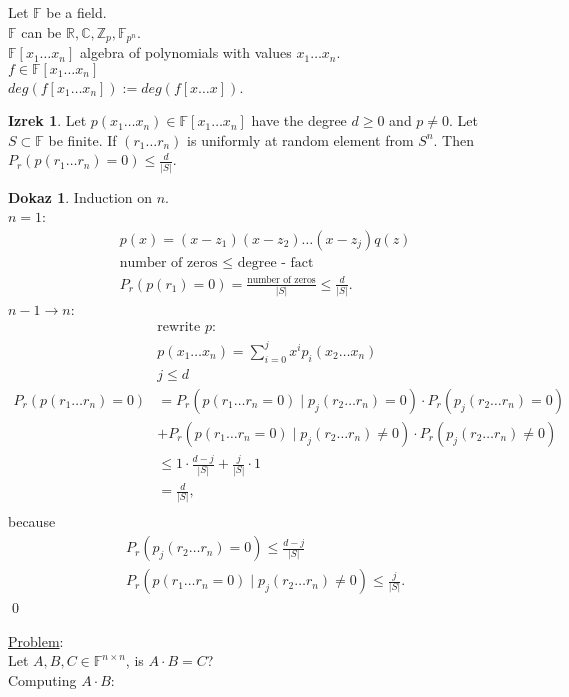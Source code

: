\documentclass[a4paper, 12pt]{book}
\theoremstyle{definition}
\newtheorem{theorem}[counter]{Izrek}
\newtheorem{pro}[counter]{Dokaz}
\theoremstyle{remark}
\newcommand{\Z}{\mathbb{Z}}
\newcommand{\R}{\mathbb{R}}
\newcommand{\C}{\mathbb{C}}
\newcommand{\F}{\mathbb{F}}
\begin{document}
Let $\F$ be a field. \\
$\F$ can be $\R, \C, \Z_p, \F_{p^n}$. \\
$\F[x_1 \dots x_n]$ algebra of polynomials with values $x_1 \dots x_n$. \\
$f \in \F[x_1 \dots x_n]$ \\
$deg(f[x_1 \dots x_n]) := deg(f[x \dots x])$.
\begin{theorem}
  Let $p(x_1 \dots x_n) \in \F[x_1 \dots x_n]$ have the degree $d \geq 0$ and $p \neq 0$.
  Let $S \subset \F$ be finite.
  If $(r_1 \dots r_n)$ is uniformly at random element from $S^n$.
  Then $P_r(p(r_1 \dots r_n) = 0) \leq \frac{d}{|S|}$.
\end{theorem}
\begin{pro}
  Induction on $n$. \\
  $n=1$:
  \begin{align*}
    &p(x) = (x-z_1) (x-z_2) \dots (x-z_j) q(z) \\
    &\text{number of zeros } \leq \text{ degree - fact} \\
    &P_r(p(r_1) = 0) = \frac{\text{number of zeros}}{|S|} \leq \frac{d}{|S|}.
  \end{align*}
  $n-1 \to n$:
  \begin{align*}
    &\text{rewrite }p: \\
    &p(x_1 \dots x_n) = \sum_{i=0}^{j} x^i p_i(x_2 \dots x_n) \\
    &j \leq d \\
    P_r(p(r_1 \dots r_n) = 0) &= P_r(p(r_1 \dots r_n = 0) \mid p_j(r_2 \dots r_n) = 0) \cdot P_r(p_j(r_2 \dots r_n) = 0) \\
    &+ P_r(p(r_1 \dots r_n = 0) \mid p_j(r_2 \dots r_n) \neq 0) \cdot P_r(p_j(r_2 \dots r_n) \neq 0) \\
    &\leq 1 \cdot \frac{d-j}{|S|} + \frac{j}{|S|} \cdot 1 \\
    &= \frac{d}{|S|}, \\
  \end{align*}
  because
  \begin{align*}
    &P_r(p_j(r_2 \dots r_n) = 0) \leq \frac{d-j}{|S|} \\
    &P_r(p(r_1 \dots r_n = 0) \mid p_j(r_2 \dots r_n) \neq 0) \leq \frac{j}{|S|}.
  \end{align*}
  \qed
\end{pro}
\underline{Problem}: \\
Let $A,B,C \in \F^{n \times n}$, is $A \cdot B = C$? \\
Computing $A \cdot B$:
\end{document}
